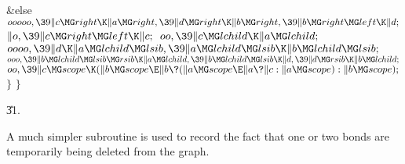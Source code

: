 \&{else}\1\5
${}\\{ooooo},\39\|c\MG\\{right}\K\|a\MG\\{right},\39\|d\MG\\{right}\K\|b\MG%
\\{right},\39\|b\MG\\{right}\MG\\{left}\K\|d;{}$\2\6
${}\|o,\39\|c\MG\\{right}\MG\\{left}\K\|c;{}$\6
${}\\{oo},\39\|c\MG\\{lchild}\K\|a\MG\\{lchild};{}$\6
${}\\{oooo},\39\|d\K\|a\MG\\{lchild}\MG\\{lsib},\39\|a\MG\\{lchild}\MG\\{lsib}%
\K\|b\MG\\{lchild}\MG\\{lsib};{}$\6
${}\\{ooo},\39\|b\MG\\{lchild}\MG\\{lsib}\MG\\{rsib}\K\|a\MG\\{lchild},\39\|b%
\MG\\{lchild}\MG\\{lsib}\K\|d,\39\|d\MG\\{rsib}\K\|b\MG\\{lchild};{}$\6
${}\\{oo},\39\|c\MG\\{scope}\K(\|b\MG\\{scope}\E\|b\?(\|a\MG\\{scope}\E\|a\?%
\|c:\|a\MG\\{scope}):\|b\MG\\{scope});{}$\6
\4${}\}{}$\2\6
\4${}\}{}$\2\par
\U31.\fi

A much simpler subroutine is used to record the fact
that one or
two bonds are temporarily being deleted from the graph.

